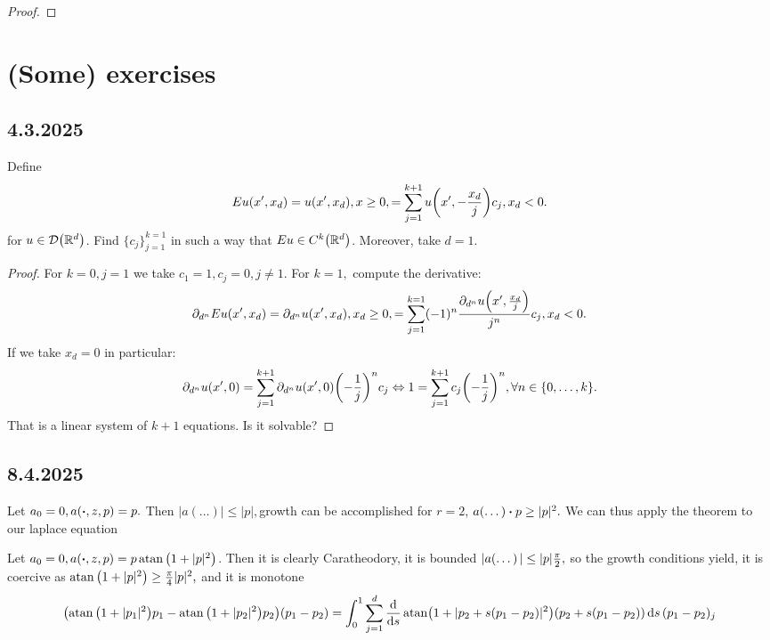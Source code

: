 \documentclass{article}
\begin{document}
\begin{proof}
\end{proof}
\section{(Some) exercises}
\label{sec:exercises}

\subsection{4.3.2025}
\label{sec:43}

\begin{example}
	Define
	\[
		Eu(x',x_d) = u(x',x_d), x \geq 0, = \sum_{j=1}^{k+1}u\qty(x',-\frac{x_d}{j})c_j, x_d<0.
	\]
	for
	$u \in \mathcal{D}\qty({\mathbb R}^d)$. Find $\{c_j\}_{j=1}^{k=1}$ in such a way that $Eu \in C^k\qty({\mathbb R}^d)$. Moreover, take $d=1$.
\end{example}
\begin{proof}
	For $k=0, j=1$ we take $c_1=1, c_j=0, j \neq 1$. For $k=1,$ compute the derivative:
	\[
		\partial_{d^n}E u(x',x_d) = \partial_{d^n}u(x',x_d), x_d \geq 0, =\sum_{j=1}^{k=1}(-1)^n\frac{\partial_{d^n}u\qty(x',\frac{x_d}{j})}{j^n}c_j, x_d <0.
	\]
	If we take $x_d=0$ in particular:
	\[
		\partial_{d^n}u\qty(x',0)= \sum_{j=1}^{k+1}\partial_{d^n}u\qty(x',0)\qty(-\frac{1}{j})^n c_j \Leftrightarrow 1 = \sum_{j=1}^{k+1}c_j \qty(-\frac{1}{j})^n, \forall n \in \{0,\dots,k\}.
	\]
	That is a linear system of $k+1$ equations. Is it solvable?
\end{proof}

\subsection{8.4.2025}
\label{sec:8.4.2025}

\begin{example}[Laplace]
	Let $a_0=0, a\qty(\vdot, z, p) = p.$ Then $|a(\dots)| \leq |p|, $growth can be accomplished for $r=2$, $a(\dots) \vdot p \geq |p|^{2}.$ We can thus apply the theorem to our laplace equation
\end{example}

\begin{example}
	Let $a_0 = 0, a\qty(\vdot, z, p) = p \atan\qty(1+|p|^{2})$. Then it is clearly Caratheodory, it is bounded $|a\qty(\dots)| \leq |p| \frac{\pi}{2},$ so the growth conditions yield, it is coercive as $ \atan\qty(1+|p|^{2})\geq \frac{\pi}{4}|p|^{2},$ and it is monotone
	\[
		\qty(\atan\qty(1+|p_1|^{2})p_1 - \atan\qty(1+|p_2|^{2})p_2)(p_1 - p_2) = \int_0^1 \sum_{j=1}^d\dv{s} \atan(1+|p_2 +s(p_1-p_2)|^{2})(p_2 + s(p_1-p_2))\dd{s} (p_1 - p_2)_j
	\]
\end{example}
\end{document}
